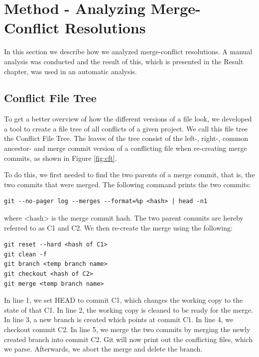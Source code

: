 \chapter{Method - Analyzing Merge-Conflict Resolutions}
In this section we describe how we analyzed merge-conflict resolutions. A manual analysis was conducted and the result of this, which is presented in the Result chapter, was used in an automatic analysis.
\section{Conflict File Tree}\label{sec:cft}
To get a better overview of how the different versions of a file look, we developed a tool to create a file tree of all conflicts of a given project. We call this file tree the Conflict File Tree. The leaves of the tree consist of the left-, right-, common ancestor- and merge commit version of a conflicting file when re-creating merge commits, as shown in Figure \ref{fig:cft}.

To do this, we first needed to find the two parents of a merge commit, that is, the two commits that were merged. The following command prints the two commits:
\lstset{language=Bash,numbers=left,xleftmargin=2em,frame=single,framexleftmargin=1.5em}
\begin{lstlisting}[frame=single,breaklines=true,tabsize=2]
git --no-pager log --merges --format=%p <hash> | head -n1
\end{lstlisting}
where <hash> is the merge commit hash. The two parent commits are hereby referred to as C1 and C2. We then re-create the merge using the following:
\lstset{language=Bash,numbers=left,xleftmargin=2em,frame=single,framexleftmargin=1.5em}
\begin{lstlisting}[frame=single,breaklines=true,tabsize=2]
git reset --hard <hash of C1>
git clean -f
git branch <temp branch name>
git checkout <hash of C2>
git merge <temp branch name>
\end{lstlisting}
In line 1, we set HEAD to commit C1, which changes the working copy to the state of that C1. In line 2,  the working copy is cleaned to be ready for the merge. In line 3, a new branch is created which points at commit C1. In line 4, we checkout commit C2. In line 5, we merge the two commits by merging the newly created branch into commit C2. Git will now print out the conflicting files, which we parse. Afterwards, we abort the merge and delete the branch.

